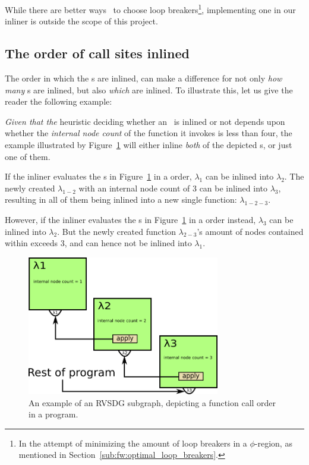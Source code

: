 While there are better ways~\cite{BasMscThesis} to choose loop
breakers\footnote{In the attempt of minimizing the amount of loop breakers in a
$\phi$-region, as mentioned in Section~\ref{sub:fw:optimal_loop_breakers}.},
implementing one in our inliner is outside the scope of this project.

\subsection{The order of call sites inlined}
\label{sub:scheme:ordering_apply_nodes}

The order in which the \applyNode s are inlined, can make a difference for not
only \textit{how many} \applyNode s are inlined, but also \textit{which} are
inlined. To illustrate this, let us give the reader the following example:

\textit{Given that the} heuristic deciding whether an \applyNode~is inlined or
not depends upon whether the \textit{internal node count} of the function it
invokes is less than four, the example illustrated by
Figure~\ref{fig:inline_ordering_ex} will either inline \textit{both} of the
depicted \applyNode s, or just one of them.

If the inliner evaluates the \applyNode s in Figure~\ref{fig:inline_ordering_ex}
in a  order, $\lambda_1$ can be inlined into $\lambda_2$. The newly
created $\lambda_{1-2}$ with an internal node count of $3$ can be inlined into
$\lambda_3$, resulting in all of them being inlined into a new single function:
$\lambda_{1-2-3}$.

However, if the inliner evaluates the \applyNode s in
Figure~\ref{fig:inline_ordering_ex} in a  order instead, $\lambda_3$
can be inlined into $\lambda_2$. But the newly created function
$\lambda_{2-3}$'s amount of nodes contained within exceeds 3, and can hence not
be inlined into $\lambda_1$.

\begin{figure}[H]
	\centering
	\includegraphics[width=0.75\textwidth]{figures/svg/inline_ordering_ex}
	\caption{An example of an RVSDG subgraph, depicting a function call
order in a program.}
	\label{fig:inline_ordering_ex}
\end{figure}

